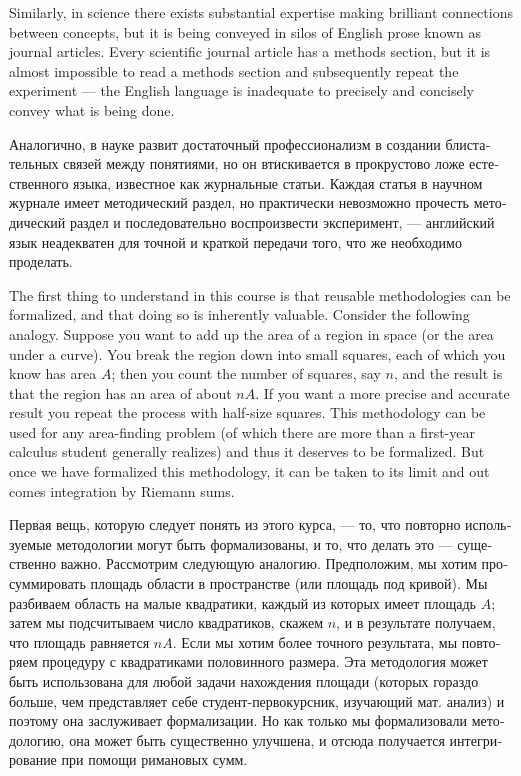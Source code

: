 \documentclass[a4paper]{book}
\theoremstyle{myth}
\begin{document}
\begin{russian}
Similarly, in science there exists substantial expertise making brilliant connections between concepts, but it is being conveyed in silos of English prose known as journal articles. Every scientific journal article has a methods section, but it is almost impossible to read a methods section and subsequently repeat the experiment — the English language is inadequate to precisely and concisely convey what is being done.

Аналогично, в науке развит достаточный профессионализм в создании блистательных связей между понятиями, но он втискивается в прокрустово ложе естественного языка, известное как журнальные статьи. Каждая статья в научном журнале имеет методический раздел, но практически невозможно прочесть методический раздел и последовательно воспроизвести эксперимент, — английский язык неадекватен для точной и краткой передачи того, что же необходимо проделать. 

The first thing to understand in this course is that reusable methodologies can be formalized, and that doing so is inherently valuable. Consider the following analogy. Suppose you want to add up the area of a region in space (or the area under a curve). You break the region down into small squares, each of which you know has area $A$; then you count the number of squares, say $n$, and the result is that the region has an area of about $nA$. If you want a more precise and accurate result you repeat the process with half-size squares. This methodology can be used for any area-finding problem (of which there are more than a first-year calculus student generally realizes) and thus it deserves to be formalized. But once we have formalized this methodology, it can be taken to its limit and out comes integration by Riemann sums.

Первая вещь, которую следует понять из этого курса, — то, что повторно используемые методологии могут быть формализованы, и то, что делать это — существенно важно. Рассмотрим следующую аналогию. Предположим, мы хотим просуммировать площадь области в пространстве (или площадь под кривой). Мы разбиваем область на малые квадратики, каждый из которых имеет площадь $A$; затем мы подсчитываем число квадратиков, скажем $n$, и в результате получаем, что площадь равняется $nA$. Если мы хотим более точного результата, мы повторяем процедуру с квадратиками половинного размера. Эта методология может быть использована для любой задачи нахождения площади (которых гораздо больше, чем представляет себе студент-первокурсник, изучающий мат. анализ) и поэтому она заслуживает формализации. Но как только мы формализовали методологию, она может быть существенно улучшена, и отсюда получается интегрирование при помощи римановых сумм. 


\end{russian}
\end{document}
